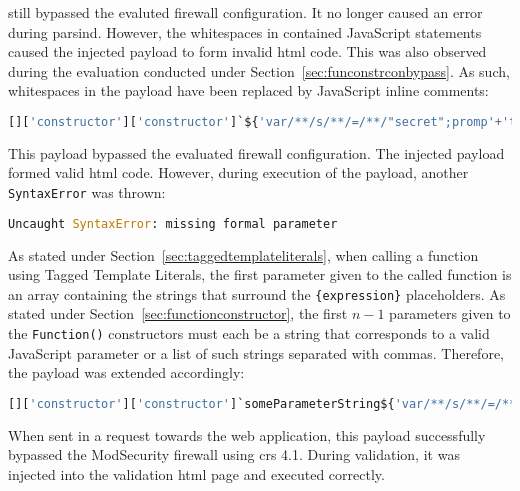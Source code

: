 still bypassed the evaluted firewall configuration. It no longer caused an error during parsind. However, the whitespaces in contained JavaScript statements caused the injected payload to form invalid \acrshort{html} code. This was also observed during the evaluation conducted under Section~\ref{sec:funconstrconbypass}. As such, whitespaces in the payload have been replaced by JavaScript inline comments:

\begin{lstlisting}[style=basicStyle, language=Python]
[]['constructor']['constructor']`${'var/**/s/**/=/**/"secret";promp'+'t`s\\u{0024}{s}`'}```
\end{lstlisting}

This payload bypassed the evaluated firewall configuration. The injected payload formed valid \acrshort{html} code. However, during execution of the payload, another \verb|SyntaxError| was thrown:

\begin{lstlisting}[style=basicStyle, language=Python]
Uncaught SyntaxError: missing formal parameter
\end{lstlisting}

As stated under Section~\ref{sec:taggedtemplateliterals}, when calling a function using Tagged Template Literals, the first parameter given to the called function is an array containing the strings that surround the \verb|{expression}| placeholders. As stated under Section~\ref{sec:functionconstructor}, the first $n-1$ parameters given to the \verb|Function()| constructors must each be a string that corresponds to a valid JavaScript parameter or a list of such strings separated with commas. 
Therefore, the payload was extended accordingly:

\begin{lstlisting}[style=basicStyle, language=Python, caption={avoiding () bypass}, label={lst:avoiding () bypass}]
[]['constructor']['constructor']`someParameterString${'var/**/s/**/=/**/"secret";promp'+'t`s\\u{0024}{s}`'}```
\end{lstlisting}

When sent in a request towards the web application, this payload successfully bypassed the ModSecurity firewall using \acrshort{crs} 4.1. During validation, it was injected into the validation \acrshort{html} page and executed correctly. 


